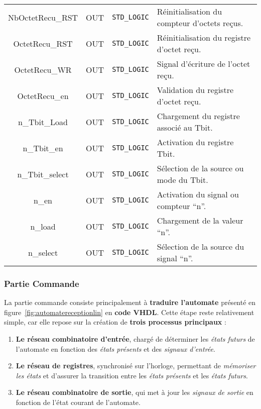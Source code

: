 \begin{center}
\begin{tabularx}{\textwidth}{|c||c|c|X|}
NbOctetRecu\_RST & OUT & \texttt{STD\_LOGIC} & Réinitialisation du compteur d’octets reçus. \\ 
OctetRecu\_RST & OUT & \texttt{STD\_LOGIC} & Réinitialisation du registre d’octet reçu. \\ 
OctetRecu\_WR & OUT & \texttt{STD\_LOGIC} & Signal d’écriture de l’octet reçu. \\ 
OctetRecu\_en & OUT & \texttt{STD\_LOGIC} & Validation du registre d’octet reçu. \\ 
n\_Tbit\_Load & OUT & \texttt{STD\_LOGIC} & Chargement du registre associé au Tbit. \\ 
n\_Tbit\_en & OUT & \texttt{STD\_LOGIC} & Activation du registre Tbit. \\ 
n\_Tbit\_select & OUT & \texttt{STD\_LOGIC} & Sélection de la source ou mode du Tbit. \\ 
n\_en & OUT & \texttt{STD\_LOGIC} & Activation du signal ou compteur “n”. \\ 
n\_load & OUT & \texttt{STD\_LOGIC} & Chargement de la valeur “n”. \\ 
n\_select & OUT & \texttt{STD\_LOGIC} & Sélection de la source du signal “n”. \\ 
\hline

\end{tabularx}
\end{center}


\subsubsection{Partie Commande}

La partie commande consiste principalement à \textbf{traduire l’automate} présenté en figure~\ref{fig:automatereceptionlin} en \textbf{code VHDL}.  
Cette étape reste relativement simple, car elle repose sur la création de \textbf{trois processus principaux} :

\begin{enumerate}
    \item \textbf{Le réseau combinatoire d’entrée}, chargé de déterminer les \textit{états futurs} de l’automate en fonction des \textit{états présents} et des \textit{signaux d’entrée}.
    \item \textbf{Le réseau de registres}, synchronisé sur l’horloge, permettant de \textit{mémoriser les états} et d’assurer la transition entre les \textit{états présents} et les \textit{états futurs}.
    \item \textbf{Le réseau combinatoire de sortie}, qui met à jour les \textit{signaux de sortie} en fonction de l’état courant de l’automate.
\end{enumerate}

